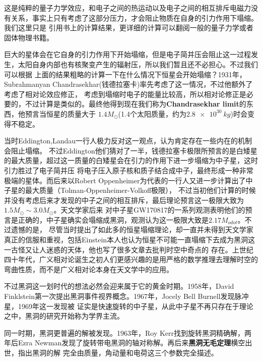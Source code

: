 \documentclass{ctexart}
\begin{document}
    这是纯粹的量子力学效应，和电子之间的热运动以及电子之间的相互排斥电磁力没有关系，事实上只有考虑了这部分压力，才会阻止物质在自身的引力作用下塌缩。我们这里只是
    引用书上的计算结果\cite{Griffiths}，更详细的计算可以翻阅一般的量子力学或者固体物理书籍。

    巨大的星体会在它自身的引力作用下开始塌缩，但是电子简并压会阻止这一过程发生，太阳自身内部也有核聚变产生的辐射压，所以我们暂且还不必担心。不过我们可以根据
    上面的结果粗略的计算一下在什么情况下恒星会开始塌缩？1931年，Subrahmanyan Chandrasekhar(钱德拉塞卡)率先考虑了这一情况，不过他额外了考虑了相对论效应修正，
    考虑到塌缩时电子的能量比较高，所以相对论修正是必要的，不过计算是类似的。最终他得到现在我们称为\textbf{Chandrasekhar limit}的东西，他预言当恒星的质量大于
    $1.4M_\odot$(1.4个太阳质量，约为$\SI[]{2.8e30}{kg}$)时会变得不稳定\cite{chan}。
    
    当时Eddington,Landau一行人极力反对这一观点，认为肯定存在一些内在的机制会阻止塌缩\cite{chan2}。
    不过Eddington他们猜对了一半，钱德拉塞卡极限所预言的是白矮星的最大质量，超过这一质量的白矮星会在引力的作用下进一步塌缩为中子星，这时引力胜过了电子简并压
    将电子压入原子核和质子结合成中子，最终形成一种非常极端的星体。而后来以Robert Oppenheimer为代表的一行人又进一步计算出了中子星的最大质量（Tolman-Oppenheimer-Volkoff极限），
    不过当初他们计算的时候并没有考虑后来才发现的中子之间的相互排斥，最后理论预言这一极限大致为$1.5M_\odot\sim 3.0M_\odot$。\cite{TOV}\cite{TOV2}天文学家后来
    对中子星GW170817的一系列观测表明他们的预言是正确的，中子星确实会塌缩成黑洞，观测认为这一极限大致是$2.17M_{odot}$\cite{shibata2017modeling}。不过遗憾的是，
    尽管当时提出了如此多的恒星塌缩理论，却一直并未得到天文学家真正的信服和重视，包括Einstein本人也认为恒星不可能一直塌缩下去成为黑洞这一古怪又让人迷惑的天体，他也写了很多文章去批判时空中奇点的
    存在。上世纪四十年代，广义相对论诞生之初人们更感兴趣的是用严格的数学推理去理解时空的弯曲性质，而不是广义相对论本身在天文学中的应用。

    不过黑洞这一划时代的想法必然会迎来属于它的黄金时期。1958年，David Finklstein第一次提出黑洞事件视界概念。\cite{finkelstein1958past}1967年，Jocely Bell Burnell发现脉冲星，1969年这一发现被
    证实是快速旋转的中子星\cite{hewish201374}\cite{pilkington1968observations}，从此中子星不再只存在于理论之中，黑洞的研究开始称为学界主流。

    同一时期，黑洞更普遍的解被发现。1963年，Roy Kerr找到旋转黑洞精确解，两年后Ezra Newman发现了旋转带电黑洞的轴对称解。\cite{newman1965metric}再后来\textbf{黑洞无毛定理}横空出世，指出黑洞的解
    完全由质量，角动量和电荷这三个参数完全描述。\cite{chrusciel2012stationary}
\end{document}

